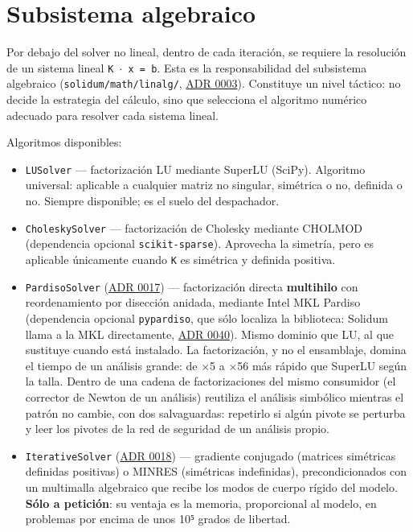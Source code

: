 \documentclass[11pt,oneside]{report}
\begin{document}
\section{Subsistema algebraico}

Por debajo del solver no lineal, dentro de cada iteración, se requiere la resolución de un sistema lineal \texttt{K \ensuremath{\cdot} x = b}. Esta es la responsabilidad del subsistema algebraico (\texttt{solidum/\allowbreak{}math/\allowbreak{}linalg/\allowbreak{}}, \hyperref[adr:0003]{ADR 0003}). Constituye un nivel táctico: no decide la estrategia del cálculo, sino que selecciona el algoritmo numérico adecuado para resolver cada sistema lineal.

Algoritmos disponibles:

\begin{itemize}
  \item \texttt{LUSolver} --- factorización LU mediante SuperLU (SciPy). Algoritmo universal: aplicable a cualquier matriz no singular, simétrica o no, definida o no. Siempre disponible; es el suelo del despachador.
  \item \texttt{CholeskySolver} --- factorización de Cholesky mediante CHOLMOD (dependencia opcional \texttt{scikit-sparse}). Aprovecha la simetría, pero es aplicable únicamente cuando \texttt{K} es simétrica y definida positiva.
  \item \texttt{PardisoSolver} (\hyperref[adr:0017]{ADR 0017}) --- factorización directa \textbf{multihilo} con reordenamiento por disección anidada, mediante Intel MKL Pardiso (dependencia opcional \texttt{pypardiso}, que sólo localiza la biblioteca: Solidum llama a la MKL directamente, \hyperref[adr:0040]{ADR 0040}). Mismo dominio que LU, al que sustituye cuando está instalado. La factorización, y no el ensamblaje, domina el tiempo de un análisis grande: de \ensuremath{\times}5 a \ensuremath{\times}56 más rápido que SuperLU según la talla. Dentro de una cadena de factorizaciones del mismo consumidor (el corrector de Newton de un análisis) reutiliza el análisis simbólico mientras el patrón no cambie, con dos salvaguardas: repetirlo si algún pivote se perturba y leer los pivotes de la red de seguridad de un análisis propio.
  \item \texttt{IterativeSolver} (\hyperref[adr:0018]{ADR 0018}) --- gradiente conjugado (matrices simétricas definidas positivas) o MINRES (simétricas indefinidas), precondicionados con un multimalla algebraico que recibe los modos de cuerpo rígido del modelo. \textbf{Sólo a petición}: su ventaja es la memoria, proporcional al modelo, en problemas por encima de unos 10⁵ grados de libertad.

\end{itemize}
\end{document}
